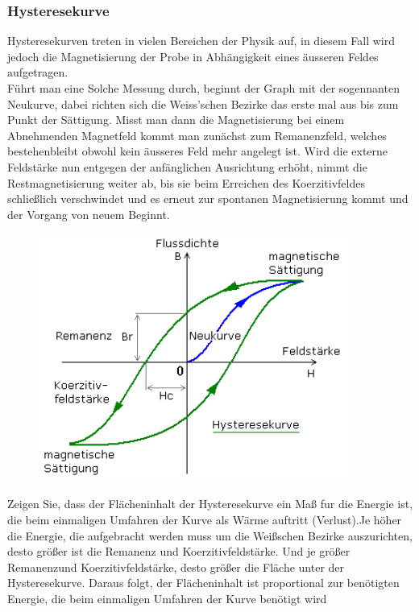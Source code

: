         \subsubsection*{Hysteresekurve}
            Hysteresekurven treten in vielen Bereichen der Physik auf, in diesem Fall wird jedoch die Magnetisierung
            der Probe in Abhängigkeit eines äusseren Feldes aufgetragen.\\
            Führt man eine Solche Messung durch, beginnt der Graph mit der sogennanten Neukurve, dabei richten sich
            die Weiss'schen Bezirke das erste mal aus bis zum Punkt der Sättigung. Misst man dann die Magnetisierung bei einem Abnehmenden Magnetfeld
            kommt man zunächst zum Remanenzfeld, welches bestehenbleibt obwohl kein äusseres Feld mehr angelegt ist. Wird die externe Feldstärke nun entgegen der anfänglichen Ausrichtung erhöht, nimmt die Restmagnetisierung weiter ab, bis
            sie beim Erreichen des Koerzitivfeldes schließlich verschwindet und es erneut zur spontanen Magnetisierung kommt und der Vorgang von neuem Beginnt.
            \begin{figure}[H]
                \centering
                \includegraphics[width=0.9\textwidth]{Images/hyster.png}
            \end{figure}

            Zeigen Sie, dass der Flächeninhalt der Hysteresekurve ein Maß fur die Energie ist, die beim einmaligen Umfahren der Kurve als Wärme
            auftritt (Verlust).Je höher die Energie, die aufgebracht werden muss um die Weißschen Bezirke auszurichten, desto größer ist die
            Remanenz und Koerzitivfeldstärke. Und je größer Remanenzund Koerzitivfeldstärke, desto größer die Fläche unter der Hysteresekurve.
            Daraus folgt, der Flächeninhalt ist proportional zur benötigten Energie, die beim einmaligen Umfahren der Kurve benötigt wird
